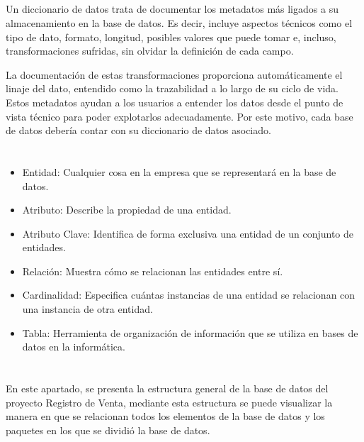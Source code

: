 \documentclass[10pt,a4paper]{article}
\begin{document}
\subsection{ \color{colorESCOM}{Diccionario de Datos}}
Un diccionario de datos trata de documentar los metadatos más ligados a su almacenamiento en la base de datos. Es decir, incluye aspectos técnicos como el tipo de dato, formato, longitud, posibles valores que puede tomar e, incluso, transformaciones sufridas, sin olvidar la definición de cada campo. 

La documentación de estas transformaciones proporciona automáticamente el linaje del dato, entendido como la trazabilidad a lo largo de su ciclo de vida. Estos metadatos ayudan a los usuarios a entender los datos desde el punto de vista técnico para poder explotarlos adecuadamente. Por este motivo, cada base de datos debería contar con su diccionario de datos asociado. 
\pagebreak

\section{\color{colorIPN}{Conceptos}}

\begin{itemize}
	\item  Entidad: Cualquier cosa en la empresa que se representará en la base de datos.
	\item  Atributo: Describe la propiedad de una entidad.
	\item  Atributo Clave: Identifica de forma exclusiva una entidad de un conjunto de entidades.
	\item Relación: Muestra cómo se relacionan las entidades entre sí.
	\item Cardinalidad: Especifica cuántas instancias de una entidad se relacionan con una instancia de otra entidad.
	\item Tabla: Herramienta de organización de información que se utiliza en bases de datos en la informática.
	
\end{itemize}

\pagebreak

\section{\color{colorIPN}{Desarrollo}}
En este apartado, se presenta la estructura general de la base de datos del proyecto Registro de Venta, mediante esta estructura se puede visualizar la manera en que se relacionan todos los elementos de la base de datos y los paquetes en los que se dividió la base de datos.
\end{document}

